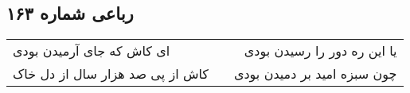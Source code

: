 \begin{center}
\section*{رباعی شماره ۱۶۳}
\label{sec:sh163}
\begin{longtable}{l p{0.5cm} r}
ای کاش که جای آرمیدن بودی
&&
یا این ره دور را رسیدن بودی
\\
کاش از پی صد هزار سال از دل خاک
&&
چون سبزه امید بر دمیدن بودی
\\
\end{longtable}
\end{center}
